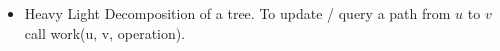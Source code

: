 \begin{itemize}
	\item Heavy Light Decomposition of a tree. To update / query a path from $u$ to $v$ call work(u, v, operation).
\end{itemize}
